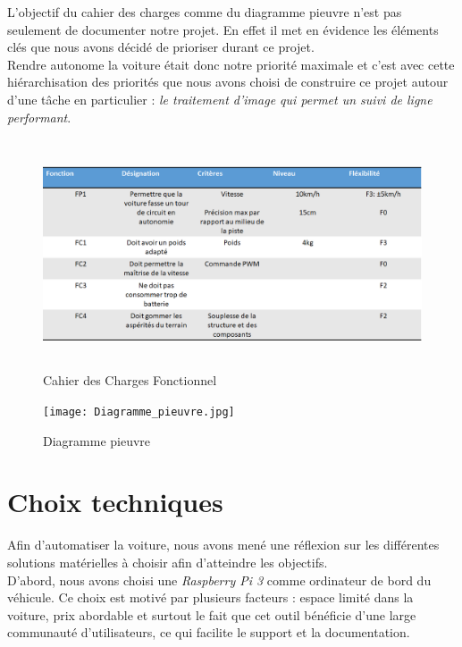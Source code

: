 \documentclass[12pt, openany]{report}
\begin{document}
L'objectif du cahier des charges comme du diagramme pieuvre n'est pas seulement de documenter notre projet. En effet il met en évidence les éléments clés que nous avons décidé de prioriser durant ce projet.\\

Rendre autonome la voiture était donc notre priorité maximale et c'est avec cette hiérarchisation des priorités que nous avons choisi de construire ce projet autour d'une tâche en particulier : \textit{le traitement d'image qui permet un suivi de ligne performant}. \\
\begin{figure}[H]
     \centering
     \includegraphics[width=\textwidth, height = 6.79cm]{Cahier des Charges.png}
     \caption{Cahier des Charges Fonctionnel}
     \label{fig:prob}
\end{figure}

\begin{figure}[H]
     \centering
     \texttt{[image: Diagramme\_pieuvre.jpg]}
     \caption{Diagramme pieuvre}
     \label{fig:prob}
\end{figure}

\section{Choix techniques}
Afin d'automatiser la voiture, nous avons mené une réflexion sur les différentes solutions matérielles à choisir afin d'atteindre les objectifs.\\

D'abord, nous avons choisi une \textit{Raspberry Pi 3} comme ordinateur de bord du véhicule. Ce choix est motivé par plusieurs facteurs : espace limité dans la voiture, prix abordable et surtout le fait que cet outil bénéficie d'une large communauté d'utilisateurs, ce qui facilite le support et la documentation.\\
\end{document}
